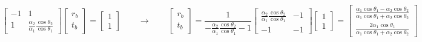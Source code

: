 \documentclass[letterpaper,10pt,italian]{jupyterBook}
\begin{document}
\begin{equation*}
\begin{split}
\begin{bmatrix} -1 & 1 \\ 1 & \frac{\alpha_2}{\alpha_1} \frac{\cos \theta_2}{\cos \theta_1} \end{bmatrix}
 \begin{bmatrix} r_b \\ t_b \end{bmatrix} = \begin{bmatrix} 1 \\ 1 \end{bmatrix}
\qquad \rightarrow \qquad
\begin{bmatrix} r_b \\ t_b \end{bmatrix} = \dfrac{1}{-\frac{\alpha_2}{\alpha_1} \frac{\cos \theta_2}{\cos \theta_1} - 1} \begin{bmatrix}  \frac{\alpha_2}{\alpha_1} \frac{\cos \theta_2}{\cos \theta_1} & -1 \\ -1 & -1  \end{bmatrix} \begin{bmatrix} 1 \\ 1 \end{bmatrix} 
= \begin{bmatrix} \frac{\alpha_1 \cos \theta_1 - \alpha_2 \cos \theta_2}{\alpha_1 \cos \theta_1 + \alpha_2 \cos \theta_2} \\ \frac{2 \alpha_1 \cos \theta_1}{\alpha_1 \cos \theta_1 + \alpha_2 \cos \theta_2} \end{bmatrix}
\end{split}
\end{equation*}
\end{document}
